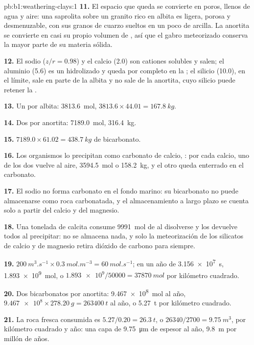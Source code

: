 \begin{solution}{pb:b1:weathering-clays:1}
\textbf{11.} El espacio que queda se convierte en poros, llenos de agua y aire: una
saprolita sobre un granito rico en albita es ligera, porosa y desmenuzable, con sus granos de cuarzo sueltos en un poco de arcilla. La anortita se convierte en casi
su propio volumen de , así que el gabro meteorizado conserva la mayor parte de su materia sólida.

\textbf{12.} El sodio ($z/r = 0.98$) y el calcio (2.0) son cationes solubles y salen; el aluminio (5.6) es un hidrolizado y queda por completo en la
; el silicio (10.0), en el límite, sale en parte de la albita y no sale de la anortita, cuyo silicio puede retener la .

\textbf{13.} Un  por albita: \qty{3813.6}{mol}, $3813.6 \times 44.01 =
\qty{167.8}{kg}$.

\textbf{14.} Dos por anortita: \qty{7189.0}{mol}, \qty{316.4}{kg}.

\textbf{15.} $7189.0 \times 61.02 = \qty{438.7}{kg}$ de bicarbonato.

\textbf{16.} Los organismos lo precipitan como carbonato de calcio,
: por cada calcio, uno de los dos
 vuelve al aire, \qty{3594.5}{mol} o \qty{158.2}{kg}, y el otro queda enterrado en el carbonato.

\textbf{17.} El sodio no forma carbonato en el fondo marino: su bicarbonato no puede almacenarse como roca carbonatada, y el almacenamiento a largo plazo se cuenta solo a partir del calcio y del magnesio.

\textbf{18.} Una tonelada de calcita consume \qty{9991}{mol} de  al disolverse y los devuelve todos al precipitar: no se almacena nada, y solo la
meteorización de los silicatos de calcio y de magnesio retira dióxido de carbono para siempre.

\textbf{19.} $\qty{200}{m^3.s^{-1}} \times \qty{0.3}{mol.m^{-3}} =
\qty{60}{mol.s^{-1}}$; en un año de \qty{3.156e7}{s}, \qty{1.893e9}{mol}, o
$\num{1.893e9}/\num{50000} = \qty{37870}{mol}$ por kilómetro cuadrado.

\textbf{20.} Dos bicarbonatos por anortita: \qty{9.467e8}{mol} al año,
$\num{9.467e8}\times\qty{278.20}{g} = \qty{263400}{t}$ al año, o
\qty{5.27}{t} por kilómetro cuadrado.

\textbf{21.} La roca fresca consumida es $5.27/0.20 = \qty{26.3}{t}$, o
$\num{26340}/2700 = \qty{9.75}{m^3}$, por kilómetro cuadrado y año: una capa de
\qty{9.75}{\micro m} de espesor al año, \qty{9.8}{m} por millón de años.


\end{solution}
